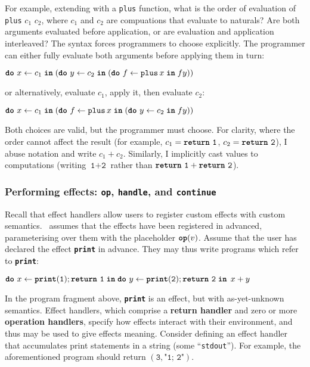 For example, extending \efflang{} with a \texttt{plus} function, what is the order of evaluation of \texttt{plus} $c_1$ $c_2$, where $c_1$ and $c_2$ are compuations that evaluate to naturals? Are both arguments evaluated before application, or are evaluation and application interleaved? The syntax forces programmers to choose explicitly. The programmer can either fully evaluate both arguments before applying them in turn: 
\begin{eff}
$\texttt{\textbf{do}} \,\, {x} \leftarrow {c_1} \; \textbf{\texttt{in}} \; {(\texttt{\textbf{do}} \,\, {y} \leftarrow {c_2} \; \textbf{\texttt{in}} \; {(\texttt{\textbf{do}} \,\, {f} \leftarrow {\texttt{plus} \, x} \; \textbf{\texttt{in}} \; {f y})})}$
\end{eff}
or alternatively, evaluate $c_1$, apply it, then evaluate $c_2$:
\begin{eff}
$\texttt{\textbf{do}} \,\, {x} \leftarrow {c_1} \; \textbf{\texttt{in}} \; {(\texttt{\textbf{do}} \,\, {f} \leftarrow {\texttt{plus} \, x} \; \textbf{\texttt{in}} \; {(\texttt{\textbf{do}} \,\, {y} \leftarrow {c_2} \; \textbf{\texttt{in}} \; {f y})})}$
\end{eff}

Both choices are valid, but the programmer must choose. For clarity, where the order cannot affect the result (for example, $c_1 = \texttt{\textbf{return}} \,\, {\texttt{1}}$, $c_2 = \texttt{\textbf{return}} \,\, {\texttt{2}}$), I abuse notation and write $c_1+c_2$. Similarly, I implicitly cast values to computations (writing $\texttt{1}+\texttt{2}$ rather than $\texttt{\textbf{return}} \,\, {\texttt{1}} + \texttt{\textbf{return}} \,\, {\texttt{2}}$).

\subsubsection{Performing effects: \texttt{op}, \texttt{handle}, and \texttt{continue}}
Recall that effect handlers allow users to register custom effects with custom semantics.\ \efflang{} assumes that the effects have been registered in advanced, parameterising over them with the placeholder $\textbf{\texttt{op}}({v})$. Assume that the user has declared the effect \texttt{\textbf{print}} in advance. They may thus write programs which refer to \texttt{\textbf{print}}:
\begin{eff}
$\texttt{\textbf{do}} \,\, {x} \leftarrow {\texttt{\textbf{print}}(\texttt{1});\texttt{\textbf{return}} \,\, {\texttt{1}}} \; \textbf{\texttt{in}} \; {{\texttt{\textbf{do}} \,\, {y} \leftarrow {\texttt{\textbf{print}}(\texttt{2});\texttt{\textbf{return}} \,\, {\texttt{2}}} \; \textbf{\texttt{in}} \; {\, x + y}}}$
\end{eff}

In the program fragment above, \textbf{\texttt{print}} is an effect, but with as-yet-unknown semantics. Effect handlers, which comprise a \textbf{return handler} and zero or more \textbf{operation handlers}, specify how effects interact with their environment, and thus may be used to give effects meaning. Consider defining an effect handler that accumulates print statements in a string (some ``\texttt{stdout}'').  For example, the aforementioned program should return $(\texttt{3}, \texttt{"1; 2"})$.

